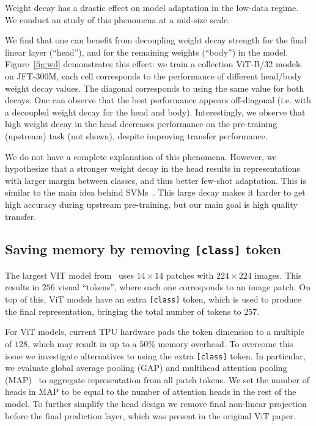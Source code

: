 Weight decay has a drastic effect on model adaptation in the low-data regime. We conduct an study of this phenomena at a mid-size scale.

We find that one can benefit from decoupling weight decay strength for the final linear layer (``head''), and for the remaining weights (``body'') in the model. 
Figure~\ref{fig:wd} demonstrates this effect: we train a collection ViT-B/32 models on JFT-300M, each cell corresponds to the performance of  different head/body weight decay values. 
The diagonal corresponds to using the same value for both decays.
One can observe that the best performance appears off-diagonal (i.e. with a decoupled weight decay for the head and body).
Interestingly, we observe that high weight decay in the head decreases performance on the pre-training (upstream) task (not shown), despite improving transfer performance.

We do not have a complete explanation of this phenomena. However, we hypothesize that a stronger weight decay in the head results in representations with larger margin between classes, and thus better few-shot adaptation.
This is similar to the main idea behind SVMs~\cite{cortes1995support}.
This large decay makes it harder to get high accuracy during upstream pre-training, but our main goal is high quality transfer.

\subsection{Saving memory by removing {\tt [class]} token}\label{sec:head}

The largest VIT model from~\cite{dosovitskiy2020} uses $14 \times 14$ patches with $224 \times 224$ images. This results in $256$ visual ``tokens'', where each one corresponds to an image patch. On top of this, ViT models have an extra {\tt [class]} token, which is used to produce the final representation, bringing the total number of tokens to $257$.

For ViT models, current TPU hardware pads the token dimension to a multiple of $128$, which may result in up to a $50\%$ memory overhead.
To overcome this issue we investigate alternatives to using the extra {\tt [class]} token.
In particular, we evaluate global average pooling (GAP) and multihead attention pooling (MAP)~\cite{lee2019set} to aggregate representation from all patch tokens.
We set the number of heads in MAP to be equal to the number of attention heads in the rest of the model.
To further simplify the head design we remove final non-linear projection before the final prediction layer, which was present in the original ViT paper.

